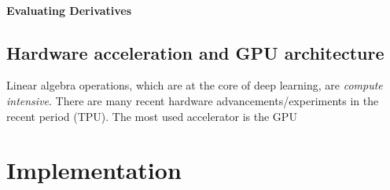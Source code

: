 \documentclass{report}
\begin{document}
\subsection{Evaluating Derivatives}

\chapter{Hardware acceleration and GPU architecture}

Linear algebra operations, which are at the core of deep learning, are
\emph{compute intensive}. There are many recent hardware
advancements/experiments in the recent period (TPU). The most used accelerator
is the GPU

\part{Implementation}
\end{document}
